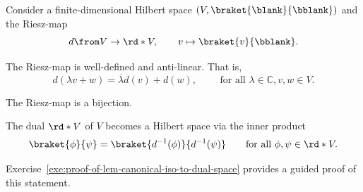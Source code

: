 \documentclass[a4paper,oneside, 12pt]{amsart}
\begin{document}
\begin{lemma}\label{lem:canonical-iso-to-dual-space}
  Consider a finite-dimensional Hilbert space \((V, \braket{\blank}{\bblank})\) and the
  Riesz-map
  \begin{equation}
    d \from V \to \rd*{V}, \qquad v \mapsto \braket{v}{\bblank}.
  \end{equation}
  \begin{thmlist}
    \item The Riesz-map is well-defined and anti-linear. That is,
    \begin{equation}
      d(\lambda v+w ) = \overline{\lambda} d(v) + d(w), \qquad \text{ for all }\lambda\in \mathbb{C}, v, w \in V.
    \end{equation}
    \item The Riesz-map is a bijection.
    \item The dual \(\rd*{V}\) of \(V\) becomes a Hilbert space via the inner product
    \begin{equation*}
      \braket{\phi}{\psi} = \braket{d^{-1}(\phi)}{d^{-1}(\psi)} \qquad \text{for all } \phi, \psi \in \rd*{V}.
    \end{equation*}
  \end{thmlist}
\end{lemma}
Exercise~\ref{exe:proof-of-lem-canonical-iso-to-dual-space} provides a guided proof of this statement.
\end{document}

